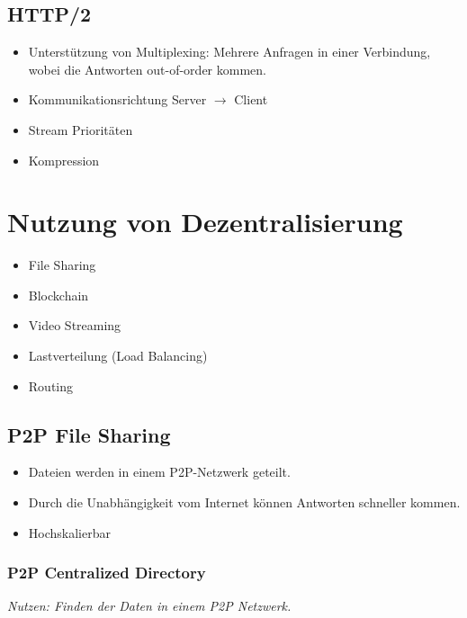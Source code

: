 \documentclass[a4paper, 11pt, accentcolor = tud3b]{tudreport}
\begin{document}
            \subsection{HTTP/2} %
				\begin{itemize}
					\item Unterstützung von Multiplexing: Mehrere Anfragen in einer Verbindung, wobei die Antworten out-of-order kommen.
					\item Kommunikationsrichtung Server \(\rightarrow\) Client
					\item Stream Prioritäten
					\item Kompression
				\end{itemize}

        \section{Nutzung von Dezentralisierung}
            \begin{itemize}
            	\item File Sharing
            	\item Blockchain
            	\item Video Streaming
            	\item Lastverteilung (Load Balancing)
            	\item Routing
            \end{itemize}

            \subsection{P2P File Sharing}
                \begin{itemize}
                	\item Dateien werden in einem P2P-Netzwerk geteilt.
                	\item Durch die Unabhängigkeit vom Internet können Antworten schneller kommen.
                	\item Hochskalierbar
                \end{itemize}
                
                \subsubsection{P2P Centralized Directory}
	                \textit{Nutzen: Finden der Daten in einem P2P Netzwerk.}
                
\end{document}
